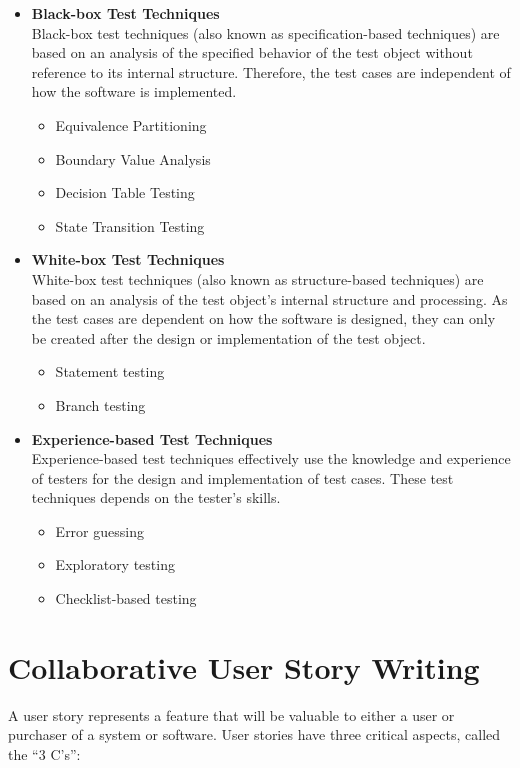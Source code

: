 \documentclass{article}
\begin{document}
\begin{multicols}{3}
{\begin{itemize}
\item \textbf{Black-box Test Techniques}\\
Black-box test techniques (also known as specification-based techniques) are based on an analysis of the specified behavior of the test object without reference to its internal structure. Therefore, the test cases are independent of how the software is implemented.

\begin{itemize}
    \item Equivalence Partitioning
    \item Boundary Value Analysis
    \item Decision Table Testing
    \item State Transition Testing
\end{itemize}

\item \textbf{White-box Test Techniques}\\
White-box test techniques (also known as structure-based techniques) are based on an analysis of the test object’s internal structure and processing. As the test cases are dependent on how the software is designed, they can only be created after the design or implementation of the test object.

\begin{itemize}
    \item Statement testing
    \item Branch testing
\end{itemize}

\item \textbf{Experience-based Test Techniques}\\
Experience-based test techniques effectively use the knowledge and experience of testers for the design and implementation of test cases. These test techniques depends on the tester’s skills.

\begin{itemize}
    \item Error guessing
    \item Exploratory testing
    \item Checklist-based testing
\end{itemize}

\end{itemize}

\section*{Collaborative User Story Writing}
A user story represents a feature that will be valuable to either a user or purchaser of a system or software. User stories have three critical aspects, called the “3 C’s”:

}
\end{multicols}
\end{document}
